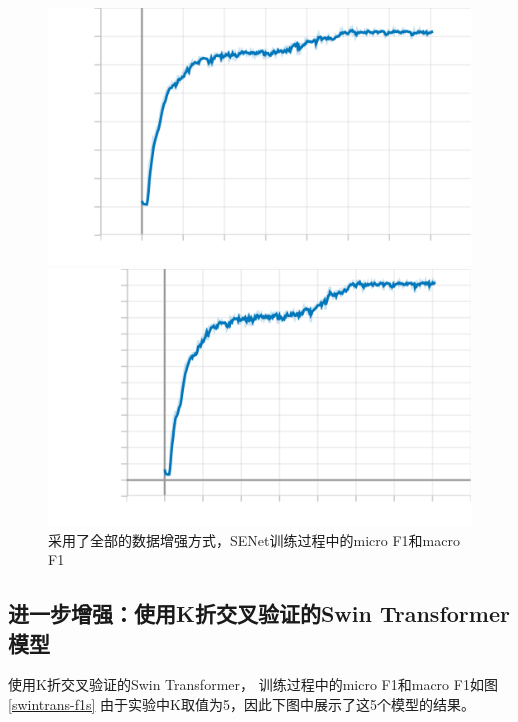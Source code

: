 \documentclass{article}
\begin{document}
\begin{figure}[H]
    \begin{minipage}[H]{0.5\linewidth}
        \centering
        \includegraphics[width=\textwidth]{figures/senet_aug_microf1score_dev.png}
    \end{minipage}
    \begin{minipage}[H]{0.5\linewidth}
        \centering
        \includegraphics[width=\textwidth]{figures/senet_aug_macrof1score_dev.png}
    \end{minipage}
    \caption{采用了全部的数据增强方式，SENet训练过程中的micro F1和macro F1}
    \label{SENet-f1s-aug}
\end{figure}

\subsection{进一步增强：使用K折交叉验证的Swin Transformer模型}

使用K折交叉验证的Swin Transformer，
训练过程中的micro F1和macro F1如图\ref{swintrans-f1s}
由于实验中K取值为5，因此下图中展示了这5个模型的结果。
\end{document}
